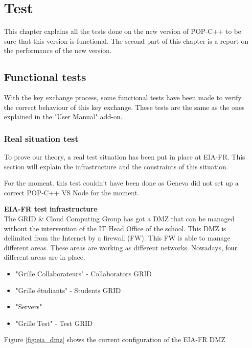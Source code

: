 \section{Test}
\label{sec:test}
This chapter explains all the tests done on the new version of POP-C++ to be sure that this version is functional. The second part of this chapter is a report on the performance of the new version.


%
%
\subsection{Functional tests}
With the key exchange process, some functional tests have been made to verify the correct behaviour of this key exchange. These tests are the same as the ones explained in the "User Manual" add-on.



%
%
\subsubsection{Real situation test}
To prove our theory, a real test situation has been put in place at EIA-FR. This section will explain the infrastructure and the constraints of this situation. \s

For the moment, this test couldn't have been done as Geneva  did not set up a correct POP-C++ VS Node for the moment. \s

\textbf{EIA-FR test infrastructure}\\
The GRID \& Cloud Computing Group has got a DMZ that can be managed without the intervention of the IT Head Office of the school. This DMZ is delimited from the Internet by a firewall (FW). This FW is able to manage different areas. These areas are working as different networks. Nowadays, four different areas are in place. 

\begin{itemize}
\item "Grille Collaborateurs" - Collaborators GRID
\item "Grille étudiants" - Students GRID
\item "Servers"
\item "Grille Test" - Test GRID
\end{itemize}

Figure \ref{fig:eia_dmz} shows the current configuration of the EIA-FR DMZ

